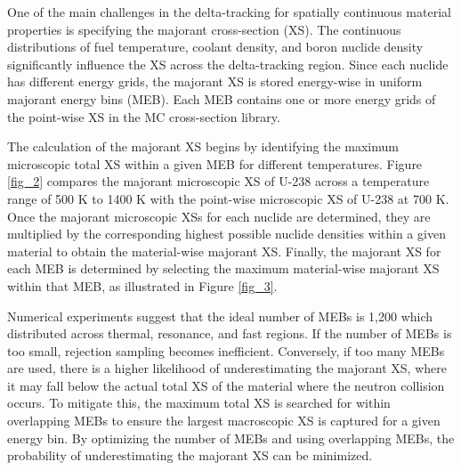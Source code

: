 One of the main challenges in the delta-tracking for spatially continuous material properties is specifying the majorant cross-section (XS). The continuous distributions of fuel temperature, coolant density, and boron nuclide density significantly influence the XS across the delta-tracking region. Since each nuclide has different energy grids, the majorant XS is stored energy-wise in uniform majorant energy bins (MEB). Each MEB contains one or more energy grids of the point-wise XS in the MC cross-section library.

The calculation of the majorant XS begins by identifying the maximum microscopic total XS within a given MEB for different temperatures. Figure \ref{fig_2} compares the majorant microscopic XS of U-238 across a temperature range of 500 K to 1400 K with the point-wise microscopic XS of U-238 at 700 K. Once the majorant microscopic XSs for each nuclide are determined, they are multiplied by the corresponding highest possible nuclide densities within a given material to obtain the material-wise majorant XS. Finally, the majorant XS for each MEB is determined by selecting the maximum material-wise majorant XS within that MEB, as illustrated in Figure \ref{fig_3}.

Numerical experiments suggest that the ideal number of MEBs is 1,200 which distributed across thermal, resonance, and fast regions. If the number of MEBs is too small, rejection sampling becomes inefficient. Conversely, if too many MEBs are used, there is a higher likelihood of underestimating the majorant XS, where it may fall below the actual total XS of the material where the neutron collision occurs. To mitigate this, the maximum total XS is searched for within overlapping MEBs to ensure the largest macroscopic XS is captured for a given energy bin. By optimizing the number of MEBs and using overlapping MEBs, the probability of underestimating the majorant XS can be minimized.

